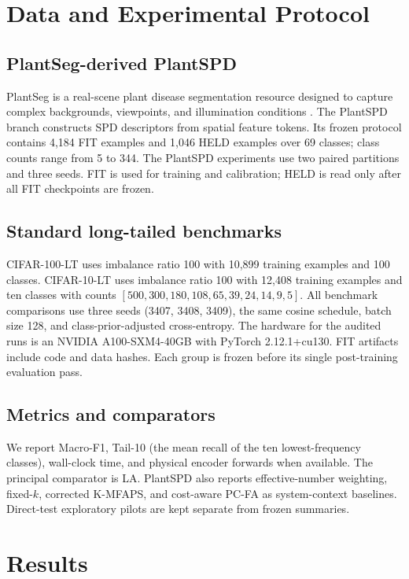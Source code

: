 \documentclass[10pt,letterpaper]{article}
\begin{document}
\section{Data and Experimental Protocol}
\subsection{PlantSeg-derived PlantSPD}
PlantSeg is a real-scene plant disease segmentation resource designed to capture complex backgrounds, viewpoints, and illumination conditions \citep{plantseg2025}. The PlantSPD branch constructs SPD descriptors from spatial feature tokens. Its frozen protocol contains 4,184 FIT examples and 1,046 HELD examples over 69 classes; class counts range from 5 to 344. The PlantSPD experiments use two paired partitions and three seeds. FIT is used for training and calibration; HELD is read only after all FIT checkpoints are frozen.

\subsection{Standard long-tailed benchmarks}
CIFAR-100-LT uses imbalance ratio 100 with 10,899 training examples and 100 classes. CIFAR-10-LT uses imbalance ratio 100 with 12,408 training examples and ten classes with counts
$[500,300,180,108,65,39,24,14,9,5]$. All benchmark comparisons use three seeds (3407, 3408, 3409), the same cosine schedule, batch size 128, and class-prior-adjusted cross-entropy. The hardware for the audited runs is an NVIDIA A100-SXM4-40GB with PyTorch 2.12.1+cu130. FIT artifacts include code and data hashes. Each group is frozen before its single post-training evaluation pass.

\subsection{Metrics and comparators}
We report Macro-F1, Tail-10 (the mean recall of the ten lowest-frequency classes), wall-clock time, and physical encoder forwards when available. The principal comparator is LA. PlantSPD also reports effective-number weighting, fixed-$k$, corrected K-MFAPS, and cost-aware PC-FA as system-context baselines. Direct-test exploratory pilots are kept separate from frozen summaries.

\section{Results}
\end{document}
